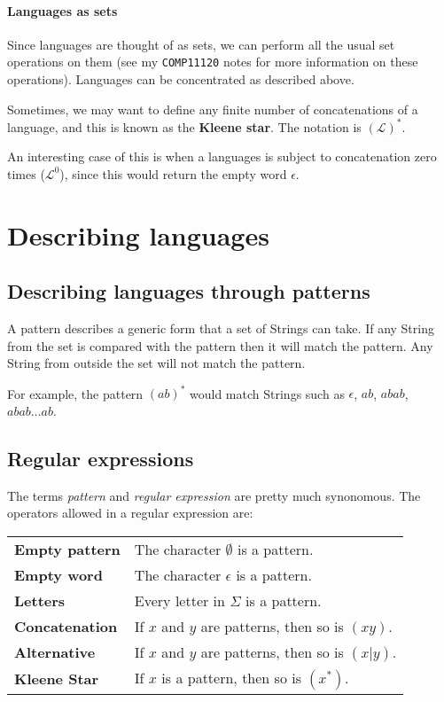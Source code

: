 \paragraph{Languages as sets} Since languages are thought of as sets, we can
perform all the usual set operations on them (see my {\tt COMP11120} notes for
more information on these operations). Languages can be concentrated as
described above.

Sometimes, we may want to define any finite number of concatenations of a
language, and this is known as the {\bf Kleene star}. The notation is
$(\mathcal{L})^*$.

An interesting case of this is when a languages is subject to concatenation zero
times ($\mathcal{L}^0$), since this would return the empty word $\epsilon$.


\section{Describing languages}

\subsection{Describing languages through patterns}

A pattern describes a generic form that a set of Strings can take. If any String
from the set is compared with the pattern then it will match the pattern. Any
String from outside the set will not match the pattern.

For example, the pattern $(ab)^*$ would match Strings such as $\epsilon$, $ab$,
$abab$, $abab \dots ab$.


\subsection{Regular expressions}

The terms {\it pattern} and {\it regular expression} are pretty much synonomous.
The operators allowed in a regular expression are:

\begin{center}
	\begin{tabular}{>{\bfseries} l l}
		Empty pattern & The character $\emptyset$ is a pattern.\\
		Empty word & The character $\epsilon$ is a pattern.\\
		Letters & Every letter in $\Sigma$ is a pattern.\\
		\rowcolor{Gray}
		Concatenation & If $x$ and $y$ are patterns, then so is $(xy)$.\\
		\rowcolor{Gray}
		Alternative & If $x$ and $y$ are patterns, then so is $(x|y)$.\\
		\rowcolor{Gray}
		Kleene Star & If $x$ is a pattern, then so is $(x^*)$.
	\end{tabular}
\end{center}

